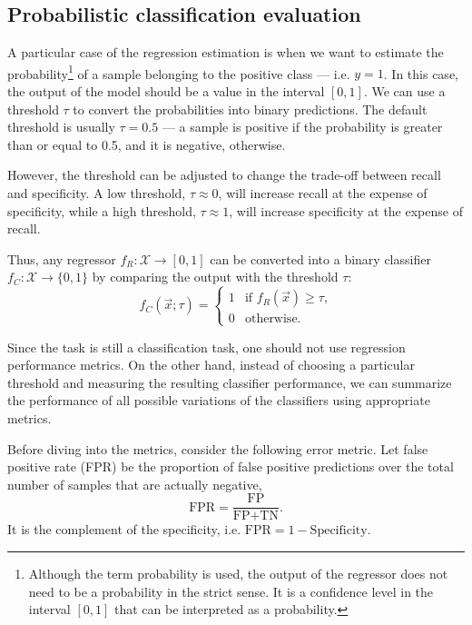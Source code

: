 \subsection{Probabilistic classification evaluation}

A particular case of the regression estimation is when we want to estimate the
probability\footnote{Although the term probability is used, the output of the regressor
does not need to be a probability in the strict sense.  It is a confidence level in the
interval $[0, 1]$ that can be interpreted as a probability.} of a sample belonging to the
positive class --- i.e. $y = 1$.  In this case, the output of the model should be a
value in the interval $[0, 1]$.  We can use a threshold $\tau$ to convert the
probabilities into binary predictions.  The default threshold is usually $\tau = 0.5$ ---
a sample is positive if the probability is greater than or equal to 0.5, and it is negative,
otherwise.

However, the threshold can be adjusted to change the trade-off between recall and
specificity. A low threshold, $\tau \approx 0$, will increase recall at the expense of
specificity, while a high threshold, $\tau \approx 1$, will increase specificity at the
expense of recall.

Thus, any regressor $f_R : \mathcal{X} \rightarrow [0, 1]$ can be converted into a binary
classifier $f_C : \mathcal{X} \rightarrow \{0, 1\}$ by comparing the output with the
threshold $\tau$:
\begin{equation*}
  f_C(\vec{x}; \tau) = \begin{cases}
    1 & \text{if } f_R(\vec{x}) \geq \tau\text{,} \\
    0 & \text{otherwise}\text{.}
  \end{cases}
\end{equation*}

Since the task is still a classification task, one should not use regression performance
metrics.  On the other hand, instead of choosing a particular threshold and measuring the
resulting classifier performance, we can summarize the performance of all possible
variations of the classifiers using appropriate metrics.

Before diving into the metrics, consider the following error metric.  Let false positive
rate (FPR) be the proportion of false positive predictions over the total number of
samples that are actually negative,
\begin{equation*}
  \text{FPR} = \frac{\text{FP}}{\text{FP} + \text{TN}}\text{.}
\end{equation*}
It is the complement of the specificity, i.e. $\text{FPR} = 1 - \text{Specificity}$.

